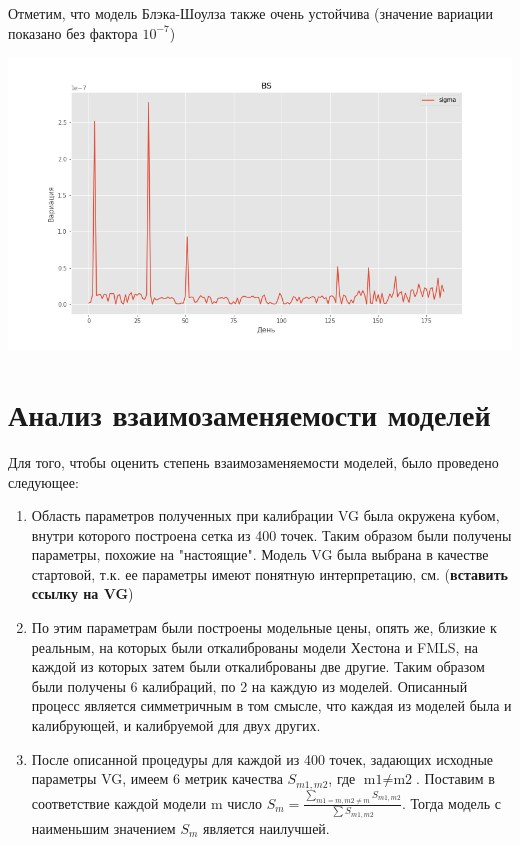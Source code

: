 \documentclass[oneside, final, 12pt]{article}
\begin{document}
Отметим, что модель Блэка-Шоулза также очень устойчива (значение вариации показано без фактора $10^{-7}$)

\begin{center}
  \includegraphics[width=1\linewidth]{img/bs_stable.png}
\end{center}

\newpage
\section{Анализ взаимозаменяемости моделей}
Для того, чтобы оценить степень взаимозаменяемости моделей, было проведено следующее:
\begin{enumerate}
\item Область параметров полученных при калибрации VG была окружена кубом, внутри которого построена сетка из 400 точек. Таким образом были получены параметры, похожие на "настоящие". Модель VG была выбрана в качестве стартовой, т.к. ее параметры имеют понятную интерпретацию, см. (\textbf{вставить ссылку на VG})
\item По этим параметрам были построены модельные цены, опять же, близкие к реальным, на которых были откалиброваны модели Хестона и FMLS, на каждой из которых затем были откалиброваны две другие. Таким образом были получены 6 калибраций, по 2 на каждую из моделей. Описанный процесс является симметричным в том смысле, что каждая из моделей была и калибрующей, и калибруемой для двух других.
\item После описанной процедуры для каждой из 400 точек, задающих исходные параметры VG, имеем 6 метрик качества \( S_{m1, m2} \), где \( \text{m1} \not = \text{m2} \). Поставим в соответствие каждой модели m число \( S_m = \frac{\sum\limits_{m1 = m, m2 \not = m}{S_{m1, m2}}}{\sum{S_{m1, m2}}} \). Тогда модель с наименьшим значением $S_m$ является наилучшей.
\end{enumerate}
\end{document}
